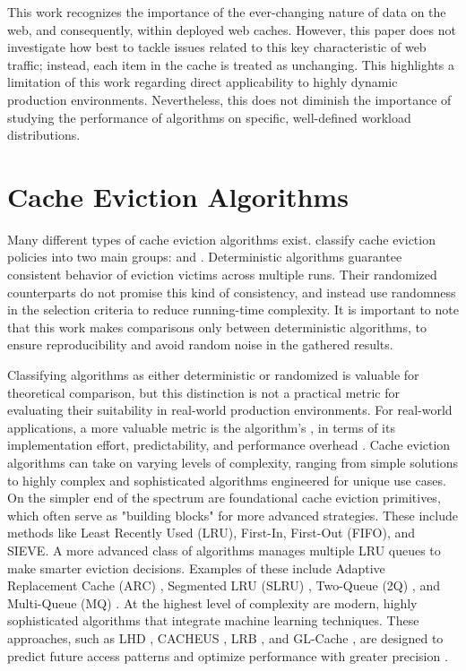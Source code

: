 This work recognizes the importance of the ever-changing nature of data on the web, and consequently, within deployed web caches. However, this paper does not investigate how best to tackle issues related to this key characteristic of web traffic; instead, each item in the cache is treated as unchanging. This highlights a limitation of this work regarding direct applicability to highly dynamic production environments. Nevertheless, this does not diminish the importance of studying the performance of algorithms on specific, well-defined workload distributions.


\section{Cache Eviction Algorithms}


Many different types of cache eviction algorithms exist. \citeauthor{web-cache-overview} classify cache eviction policies into two main groups:  and . Deterministic algorithms guarantee consistent behavior of eviction victims across multiple runs. Their randomized counterparts do not promise this kind of consistency, and instead use randomness in the selection criteria to reduce running-time complexity\cite{web-cache-overview}. It is important to note that this work makes comparisons only between deterministic algorithms, to ensure reproducibility and avoid random noise in the gathered results.



Classifying algorithms as either deterministic or randomized is valuable for theoretical comparison, but this distinction is not a practical metric for evaluating their suitability in real-world production environments. For real-world applications, a more valuable metric is the algorithm's , in terms of its implementation effort, predictability, and performance overhead \cite{sieve, s3-fifo}. Cache eviction algorithms can take on varying levels of complexity, ranging from simple solutions to highly complex and sophisticated algorithms engineered for unique use cases. On the simpler end of the spectrum are foundational cache eviction primitives, which often serve as "building blocks" for more advanced strategies. These include methods like Least Recently Used (LRU), First-In, First-Out (FIFO), and SIEVE. A more advanced class of algorithms manages multiple LRU queues to make smarter eviction decisions. Examples of these include Adaptive Replacement Cache (ARC) \cite{alg-arc}, Segmented LRU (SLRU) \cite{alg-ss-lru}, Two-Queue (2Q) \cite{alg-2q}, and Multi-Queue (MQ) \cite{alg-mq}. At the highest level of complexity are modern, highly sophisticated algorithms that integrate machine learning techniques. These approaches, such as LHD \cite{alg-lhd}, CACHEUS \cite{alg-cacheus}, LRB \cite{alg-lrb}, and GL-Cache \cite{alg-gl-cache}, are designed to predict future access patterns and optimize performance with greater precision \cite{sieve}.

